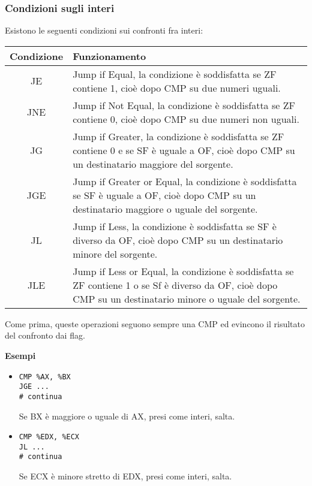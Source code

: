 \documentclass[a4paper,11pt]{article}
\begin{document}
\subsubsection{Condizioni sugli interi}
Esistono le seguenti condizioni sui confronti fra interi:

\begin{table}[h!]
	\center {}
	\begin{tabular} { c  p{10cm} }
		\bfseries Condizione & \bfseries Funzionamento \\
		\hline 
		JE & Jump if Equal, la condizione è soddisfatta se ZF contiene 1, cioè dopo CMP su due numeri uguali. \\
		JNE & Jump if Not Equal, la condizione è soddisfatta se ZF contiene 0, cioè dopo CMP su due numeri non uguali. \\ 
		JG & Jump if Greater, la condizione è soddisfatta se ZF contiene 0 e se SF è uguale a OF, cioè dopo CMP su un destinatario maggiore del sorgente. \\
		JGE & Jump if Greater or Equal, la condizione è soddisfatta se SF è uguale a OF, cioè dopo CMP su un destinatario maggiore o uguale del sorgente. \\ 
		JL & Jump if Less, la condizione è soddisfatta se SF è diverso da OF, cioè dopo CMP su un destinatario minore del sorgente. \\
		JLE & Jump if Less or Equal, la condizione è soddisfatta se ZF contiene 1 o se Sf è diverso da OF, cioè dopo CMP su un destinatario minore o uguale del sorgente. \\ 
	\end{tabular}
\end{table}

Come prima, queste operazioni seguono sempre una CMP ed evincono il risultato del confronto dai flag.

\par\medskip
\noindent
\textbf{\textsf{Esempi}} \\
\begin{itemize}
	\item 
\begin{lstlisting}[language=assembler,style=codestyle]	
CMP %AX, %BX
JGE ...
# continua
\end{lstlisting}
Se BX è maggiore o uguale di AX, presi come interi, salta.

	\item 
\begin{lstlisting}[language=assembler,style=codestyle]	
CMP %EDX, %ECX
JL ...
# continua
\end{lstlisting}
Se ECX è minore stretto di EDX, presi come interi, salta.
\end{itemize}
\end{document}
